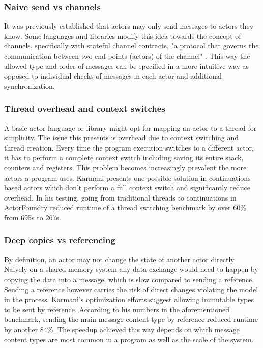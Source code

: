 \documentclass[A4]{article}
\begin{document}
\subsubsection{Naive send vs channels}
It was previously established that actors may only send messages to actors they know. Some languages and libraries modify this idea towards the concept of channels, specifically with stateful channel contracts, "a protocol that governs the communication between two end-points (actors) of the channel" \cite[p.~8]{reference/parallel/KarmaniA11}. This way the allowed type and order of messages can be specified in a more intuitive way as opposed to individual checks of messages in each actor and additional synchronization. \cite[p.~8]{reference/parallel/KarmaniA11}
\subsubsection{Thread overhead and context switches}
A basic actor language or library might opt for mapping an actor to a thread for simplicity. The issue this presents is overhead due to context switching and thread creation. Every time the program execution switches to a different actor, it has to perform a complete context switch including saving its entire stack, counters and registers. This problem becomes increasingly prevalent the more actors a program uses. Karmani presents one possible solution in continuations based actors which don't perform a full context switch and significantly reduce overhead. In his testing, going from traditional threads to continuations in ActorFoundry reduced runtime of a thread switching benchmark by over 60\% from 695s to 267s. \cite[p.~8]{conf/pppj/KarmaniSA09}
\subsubsection{Deep copies vs referencing}
By definition, an actor may not change the state of another actor directly. Naively on a shared memory system any data exchange would need to happen by copying the data into a message, which is slow compared to sending a reference. Sending a reference however carries the risk of direct changes violating the model in the process. Karmani's optimization efforts suggest allowing immutable types to be sent by reference. According to his numbers in the aforementioned benchmark, sending the main message content type by reference reduced runtime by another 84\%. \cite[p.~9]{conf/pppj/KarmaniSA09}
The speedup achieved this way depends on which message content types are most common in a program as well as the scale of the system.
\end{document}
